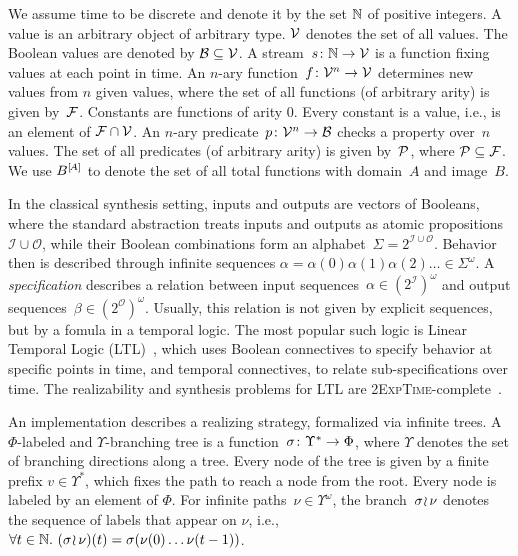 We assume time to be discrete and denote it by the set $ \dtime $ of
positive integers.  A value is an arbitrary object of arbitrary
type. $ \values $ denotes the set of all values.  The Boolean values
are denoted by $ \bool \subseteq \values $.  A
stream~$ \signal \from \dtime \to \values $ is a function fixing
values at each point in time.
An $ n $-ary function~$ f \from \values^{n} \to \values $ determines
new values from $ n $ given values, where the set of all functions (of
arbitrary arity) is given by~$ \functions $. Constants are functions
of arity 0. Every constant is a value, i.e., is an element of
$ \functions \cap \values $. An $ n $-ary
predicate~$ p \from \values^{n} \to \bool $ checks a property
over~$ n $ values.  The set of all predicates (of arbitrary arity) is
given by~$ \predicates $, where $ \predicates \subseteq \functions $.
We use $ \fspace{\hspace{-1pt}A}{B} $ to denote the set of all total functions with
domain~$ A $ and image~$ B $.

In the classical synthesis setting, inputs and outputs are vectors of
Booleans, where the standard abstraction treats inputs and outputs as
atomic propositions $ \mathcal{I} \cup \mathcal{O} $, while their
Boolean combinations form an
alphabet~\mbox{$ \Sigma = 2^{\mathcal{I} \cup \mathcal{O}}
  $}. Behavior then is described through infinite sequences
$ \alpha = \alpha(0)\alpha(1)\alpha(2) \ldots \in \Sigma^{\omega} $.
A \textit{specification} describes a relation between input
sequences~\mbox{$ \alpha \in (2^{\mathcal{I}})^{\omega} $} and output
sequences~\mbox{$ \beta \in (2^{\mathcal{O}})^{\omega} $}. Usually,
this relation is not given by explicit sequences, but by a fomula in a
temporal logic.  The most popular such logic is Linear Temporal Logic
(LTL)~\cite{Pnueli:1977}, which uses Boolean connectives to specify
behavior at specific points in time, and temporal connectives, to
relate sub-specifications over time. The realizability and synthesis
problems for LTL are 2\textsc{ExpTime}-complete~\cite{PnueliR89}.

An implementation describes a realizing strategy, formalized via infinite trees. A $ \Phi $-labeled
and \mbox{$ \Upsilon $-}branching tree is a
function~$ \sigma \from \Upsilon^{*} \to \Phi $, where $ \Upsilon $
denotes the set of branching directions along a tree. Every node of
the tree is given by a finite prefix $ v \in \Upsilon^{*} $, which
fixes the path to reach a node from the root. Every node is labeled
by an element of $ \Phi $. For infinite
paths~$ \nu \in \Upsilon^{\omega} $, the
branch~$ \branch{\sigma}{\nu} $ denotes the sequence of labels that appear
on $ \nu $, i.e.,
$ \forall t \in \nats. \ (\branch{\sigma}{\nu})(t) =
\sigma(\nu(0) \ldots \nu(t-1)) $.
